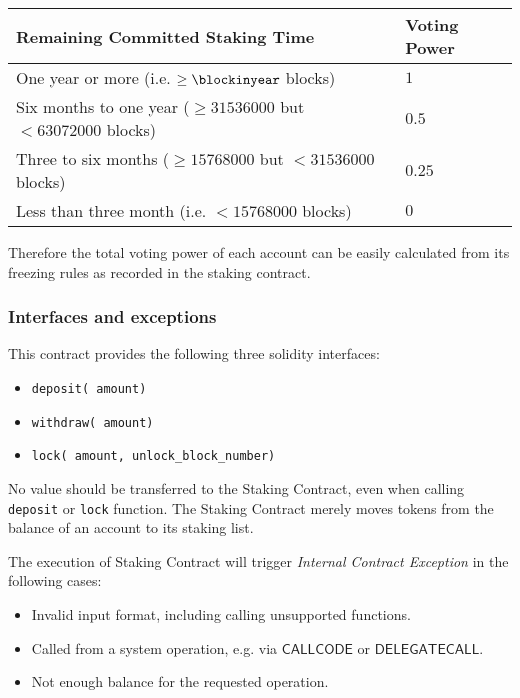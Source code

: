 \par
\begin{center}
\begin{tabular}{ll}
\toprule
Remaining Committed Staking Time & Voting Power \\
\midrule
One year or more (i.e. $\ge \blockinyear$ blocks) & $1$  \\
Six months to one year ($\ge 31536000$ but $<63072000$ blocks) & $0.5$ \\
Three to six months ($\ge 15768000$ but $<31536000$ blocks) & $0.25$\\
Less than three month (i.e. $< 15768000$ blocks) & $0$ \\
\bottomrule
\end{tabular}
\end{center}
\par
Therefore the total voting power of each account can be easily calculated from its freezing rules as recorded in the staking contract.

\subsubsection{Interfaces and exceptions}

This contract provides the following three solidity interfaces:
\begin{itemize}[nosep]
	\item {\tt deposit( amount)}
    \item {\tt withdraw( amount)}
    \item {\tt lock( amount,  unlock\_block\_number)} 
\end{itemize}

No value should be transferred to the Staking Contract, 
even when calling {\tt deposit} or {\tt lock} function. 
The Staking Contract merely moves tokens from the balance of an account to its staking list. 

The execution of Staking Contract will trigger \emph{Internal Contract Exception} in the following cases:
\begin{itemize}[nosep]
	\item Invalid input format, including calling unsupported functions.

	\item Called from a system operation, e.g. via $\mathsf{CALLCODE}$ or $\mathsf{DELEGATECALL}$.

    \item Not enough balance for the requested operation.
\end{itemize}


